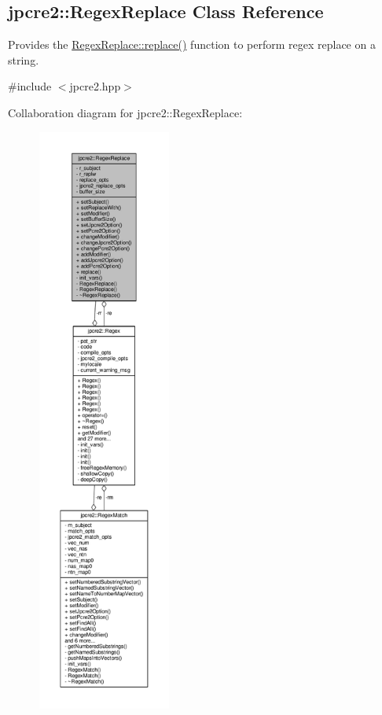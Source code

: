\hypertarget{classjpcre2_1_1RegexReplace}{}\subsection{jpcre2\+:\+:Regex\+Replace Class Reference}
\label{classjpcre2_1_1RegexReplace}


Provides the \hyperlink{classjpcre2_1_1RegexReplace_afd087fa7a9bfedec802d1a3dd7edbdd0}{Regex\+Replace\+::replace()} function to perform regex replace on a string.  




{\ttfamily \#include $<$jpcre2.\+hpp$>$}



Collaboration diagram for jpcre2\+:\+:Regex\+Replace\+:\nopagebreak
\begin{figure}[H]
\begin{center}
\leavevmode
\includegraphics[height=550pt]{classjpcre2_1_1RegexReplace__coll__graph}
\end{center}
\end{figure}
